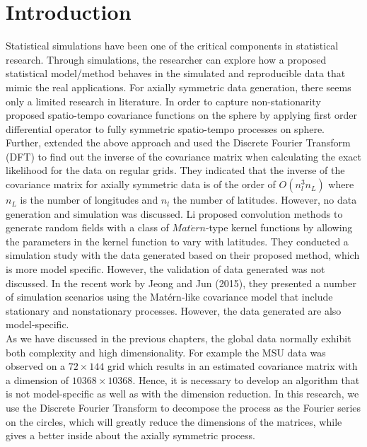 %
%
%



\section{Introduction}

Statistical simulations have been one of the critical components in statistical research. Through simulations, the researcher can explore how a proposed statistical model/method behaves in the simulated and reproducible data that mimic the real applications. For axially symmetric data generation, there seems only a limited research in literature. In order to capture non-stationarity \cite{JunStein2007} proposed spatio-tempo covariance functions on the sphere by applying first order differential operator to fully symmetric spatio-tempo processes on sphere. Further, \cite{JunStein2008} extended the above approach and used the Discrete Fourier Transform (DFT) to find out the inverse of the covariance matrix when calculating the exact likelihood for the data on regular grids. They indicated that the inverse of the covariance matrix for axially symmetric data is of the order of $O(n_l^3 n_L)$ where $n_L$ is the number of longitudes and $n_l$ the number of latitudes. However, no data generation and simulation was discussed. Li \cite{Li2013} proposed convolution methods to generate random fields with a class of $Mat\acute{e}rn$-type kernel functions by allowing the parameters in the kernel function to vary with latitudes. They conducted a simulation study with the data generated based on their proposed method, which is more model specific. However, the validation of data generated was not discussed. In the recent work by Jeong and Jun (2015), they presented a number of simulation scenarios using the Mat\'{e}rn-like covariance model that include stationary and nonstationary processes. However, the data generated are also model-specific. \\

As we have discussed in the previous chapters, the global data normally exhibit both complexity and high dimensionality. For example the MSU data was observed on a $72 \times 144$ grid which results in an estimated covariance matrix with a dimension of $10368\times 10368$. Hence, it is necessary to develop an algorithm that is not model-specific as well as with the dimension reduction. In this research, we use the Discrete Fourier Transform to decompose the process as the Fourier series on the circles, which will greatly reduce the dimensions of the matrices, while gives a better inside about the axially symmetric process. \\

